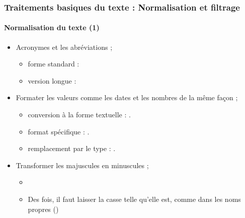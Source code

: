 \documentclass[xcolor=table]{beamer}
\begin{document}
\begin{frame}
\frametitle{Traitements basiques du texte : Normalisation et filtrage}
\framesubtitle{Normalisation du texte (1)}

\begin{itemize}
	
	\item Acronymes et les abréviations ;
	\begin{itemize}
		\item forme standard : 
		\item version longue : 
	\end{itemize}
	
	\item Formater les valeurs comme les dates et les nombres de la même façon ;
	\begin{itemize}
		\item conversion à la forme textuelle : .
		\item format spécifique : .
		\item remplacement par le type : .
	\end{itemize}
	
	\item Transformer les majuscules en minuscules ;
	\begin{itemize}
		\item {}
		\item Des fois, il faut laisser la casse telle qu'elle est, comme dans les noms propres ()
	\end{itemize}
\end{itemize}

\end{frame}
\end{document}

